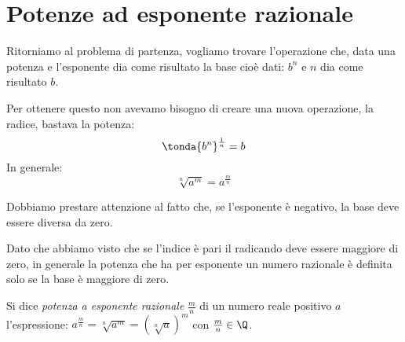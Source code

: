 \begin{comment}
\begin{esempio}
 Determina le condizioni di esistenza della radice 
 \(\sqrt[4]{\dfrac{x-1}{x+1}}\).

C.E. \(\dfrac{x-1}{x+1}\ge 0\). 
Occorre discutere il segno della frazione \(f\), combinando il segno del 
numeratore \(N\) e del denominatore \(D\):

\begin{center}
 
\end{center}
Pertanto C.E. \(x<-1\vee x\ge 1\).
\end{esempio}


\end{comment}

\section{Potenze ad esponente razionale}
\label{sec:radicali_esp_razionale}

Ritorniamo al problema di partenza, vogliamo trovare l'operazione che, data 
una potenza e l'esponente dia come risultato la base cioè dati: \(b^n\) e 
\(n\) dia come risultato \(b\).

Per ottenere questo non avevamo bisogno di creare una nuova operazione, la 
radice, bastava la potenza:
\[\tonda{b^n}^\frac{1}{n}=b\]
In generale:
\[\sqrt[n]{a^m}=a^\frac{m}{n}\]
\begin{osservazione}
 Dobbiamo prestare attenzione al fatto che, se l'esponente è negativo, la 
base deve essere diversa da zero.
\end{osservazione}

\begin{osservazione}
Dato che abbiamo visto che se l'indice è pari il radicando deve essere 
maggiore di zero, in generale la potenza che ha per esponente un numero 
razionale è definita solo se la base è maggiore di zero.
\end{osservazione}

\begin{definizione}
Si dice \emph{potenza a esponente razionale} \(\frac m n\) di un numero reale 
positivo \(a\) l'espressione:
 \(a^{\frac m n}=\sqrt[n]{a^m}=\left(\sqrt[n]a\right)^m\) con 
 \(\frac m n\in \Q\).
\end{definizione}

